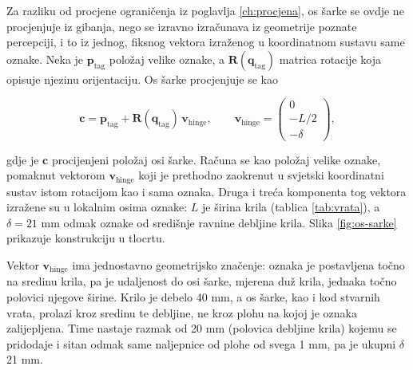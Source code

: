 Za razliku od procjene ograničenja iz poglavlja \ref{ch:procjena}, os šarke se ovdje ne
procjenjuje iz gibanja, nego se izravno izračunava iz geometrije poznate percepciji, i to iz
jednog, fiksnog vektora izraženog u koordinatnom sustavu same oznake. Neka je $\bm{p}_{\mathrm{tag}}$
položaj velike oznake, a $\bm{R}(\bm{q}_{\mathrm{tag}})$ matrica rotacije koja opisuje njezinu
orijentaciju. Os šarke procjenjuje se kao

\begin{equation}
      \bm{c} = \bm{p}_{\mathrm{tag}} + \bm{R}(\bm{q}_{\mathrm{tag}})\, \bm{v}_{\mathrm{hinge}} ,
      \qquad
      \bm{v}_{\mathrm{hinge}} = \begin{pmatrix} 0 \\[2pt] -L/2 \\[2pt] -\delta \end{pmatrix} ,
      \label{eq:axis}
\end{equation}

gdje je $\bm{c}$ procijenjeni položaj osi šarke. Računa se kao položaj velike oznake, pomaknut vektorom
$\bm{v}_{\mathrm{hinge}}$ koji je prethodno zaokrenut u svjetski koordinatni sustav istom
rotacijom kao i sama oznaka. Druga i treća komponenta tog vektora izražene su u lokalnim
osima oznake: $L$ je širina krila (tablica \ref{tab:vrata}), a $\delta = 21\text{ mm}$ odmak
oznake od središnje ravnine debljine krila. Slika \ref{fig:os-sarke} prikazuje konstrukciju u tlocrtu.

Vektor $\bm{v}_{\mathrm{hinge}}$ ima jednostavno geometrijsko značenje: oznaka je
postavljena točno na sredinu krila, pa je udaljenost do osi šarke, mjerena duž krila, jednaka
točno polovici njegove širine. Krilo je debelo 40 mm, a os šarke, kao i kod stvarnih vrata,
prolazi kroz sredinu te debljine, ne kroz plohu na kojoj je oznaka zalijepljena. Time nastaje
razmak od 20 mm (polovica debljine krila) kojemu se pridodaje i sitan odmak same naljepnice od plohe od
svega 1 mm, pa je ukupni $\delta$ 21 mm.


